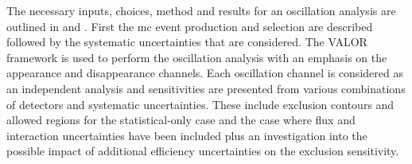 The necessary inputs, choices, method and results for an oscillation analysis are outlined in  and . First the \gls{mc} event production and selection are described followed by the systematic uncertainties that are considered. The VALOR framework is used to perform the oscillation analysis with an emphasis on the \nue appearance and \nue disappearance channels. Each oscillation channel is considered as an independent analysis and sensitivities are presented from various combinations of detectors and systematic uncertainties. These include exclusion contours and allowed regions for the statistical-only case and the case where flux and interaction uncertainties have been included plus an investigation into the possible impact of additional efficiency uncertainties on the exclusion sensitivity. 